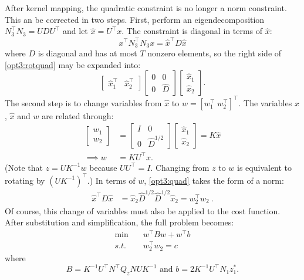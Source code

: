 \documentclass[conference]{IEEEtran}
\begin{document}
After kernel mapping, the quadratic constraint is no longer a norm
constraint. This an be corrected in two steps. First, perform an
eigendecomposition $N_3^\top N_3 = UDU^\top$ and let $\hat{x} = U^\top
x$. The constraint is diagonal in terms of $\hat{x}$:
\begin{equation}
\label{opt3:rotquad} x^\top N_3^\top N_3 x = \hat{x}^\top D\hat{x}
\end{equation}
where $D$ is diagonal and has at most $T$ nonzero elements, so the
right side of \eqref{opt3:rotquad} may be expanded into:
\begin{equation}
\begin{bmatrix}
\hat{x}_1^\top & \hat{x}_2^\top \end{bmatrix}
\begin{bmatrix} 0 & 0 \\ 0 & \hat{D} \end{bmatrix}
\begin{bmatrix}
\hat{x}_1 \\ \hat{x}_2
\end{bmatrix}.
\end{equation}
The second step is to change variables from $\hat{x}$ to $w =
[w_1^\top \; w_2^\top]^\top$. The variables $x$, $\hat{x}$ and $w$ are
related through:
\begin{align}
\label{eq:x_to_w} \begin{bmatrix} w_1 \\ w_2 \end{bmatrix} &=
\begin{bmatrix} I & 0 \\ 0 & \hat{D}^{1/2} \end{bmatrix}
\begin{bmatrix} \hat{x}_1 \\ \hat{x}_2 \end{bmatrix} = K\hat{x} \\
\nonumber \implies w &= KU^\top x.
\end{align}
(Note that $z = UK^{-1}w$ because $UU^\top = I$. Changing from $z$ to $w$
is equivalent to rotating by $(UK^{-1})^\top$.) In terms of $w$, \eqref{opt3:quad} takes the form of a norm:
\begin{align}
\hat{x}^\top D\hat{x} &= \hat{x}_2\hat{D}^{1/2}\hat{D}^{1/2}\hat{x}_2
= w_2^\top w_2~.
\end{align}
Of course, this change of variables must also be applied to the cost function. After substitution and simplification, the full problem becomes:
\begin{subequations}\label{opt4}
\begin{align}
\label{opt4:obj} \min\quad &w^\top Bw + w^\top b \\
\label{opt4:quad} s.t.\quad &w_2^\top w_2 = c
\end{align}
\end{subequations}
where 
\[
B= K^{-1}U^\top N^\top Q_z NUK^{-1} \text{ and }b=2 K^{-1}U^\top N_1z_1^*.
\]
\end{document}
